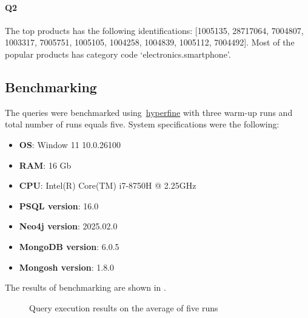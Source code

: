 \documentclass[conference]{IEEEtran}
\begin{document}
\paragraph{Q2} The top products has the following identifications: [1005135,
28717064,
7004807,
1003317,
7005751,
1005105,
1004258,
1004839,
1005112,
7004492]. Most of the popular products has category code `electronics.smartphone'.

\subsection{Benchmarking}

The queries were benchmarked using~\href{https://github.com/sharkdp/hyperfine}{hyperfine} with three warm-up runs and total number of runs equals five. System specifications were the following:
\begin{itemize}
    \item \textbf{OS}: Window 11 10.0.26100
    \item \textbf{RAM}: 16 Gb
    \item \textbf{CPU}: Intel(R) Core(TM) i7-8750H @ 2.25GHz
    \item \textbf{PSQL version}: 16.0
    \item \textbf{Neo4j version}: 2025.02.0
    \item \textbf{MongoDB version}: 6.0.5
    \item \textbf{Mongosh version}: 1.8.0
\end{itemize}

The results of benchmarking are shown in .

\begin{figure}[hbthbt]
    \centering
    \pgfplotsset{compat=1.10}
    \caption{Query execution results on the average of five runs}\label{fig:queies_run}
\end{figure}
\end{document}

